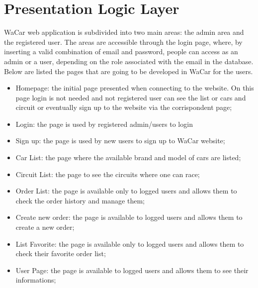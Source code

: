 \section{Presentation Logic Layer}


WaCar web application is subdivided into two main areas: the admin area and the registered user. The areas are accessible through the login page, where, by inserting a valid combination of email and password, people can access as an admin or a user, depending on the role associated with the email in the database. Below are listed the pages that are going to be developed in WaCar for the users.
\begin{itemize}
    \item Homepage: the initial page presented when connecting to the website. On this page login is not needed and not registered user can see the list or cars and circuit or eventually sign up to the website via the corrispondent page;
    \item Login: the page is used by registered admin/users to login
    \item Sign up: the page is used by new users to sign up to WaCar website;
    \item Car List: the page where the available brand and model of cars are listed;
    \item Circuit List: the page to see the circuits where one can race;
    \item Order List: the page is available only to logged users and allows them to check the order history and manage them;
    \item Create new order: the page is available to logged users and allows them to create a new order;
    \item List Favorite: the page is available only to logged users and allows them to check their favorite order list;
    \item User Page: the page is available to logged users and allows them to see their informations;\\
\end{itemize}

